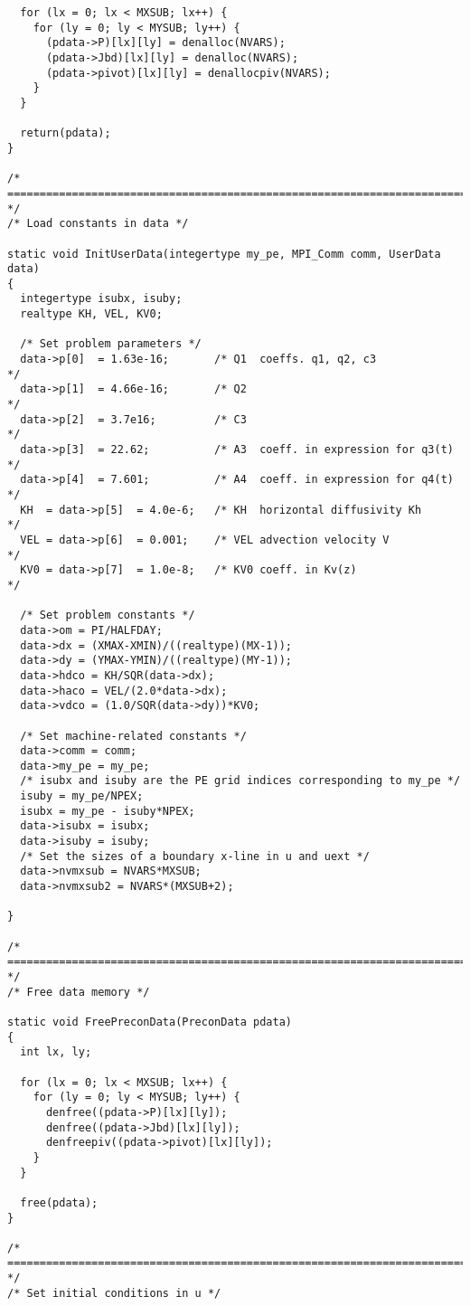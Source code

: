 \begin{verbatim}
  for (lx = 0; lx < MXSUB; lx++) {
    for (ly = 0; ly < MYSUB; ly++) {
      (pdata->P)[lx][ly] = denalloc(NVARS);
      (pdata->Jbd)[lx][ly] = denalloc(NVARS);
      (pdata->pivot)[lx][ly] = denallocpiv(NVARS);
    }
  }

  return(pdata);
}

/* ======================================================================= */
/* Load constants in data */

static void InitUserData(integertype my_pe, MPI_Comm comm, UserData data)
{
  integertype isubx, isuby;
  realtype KH, VEL, KV0;

  /* Set problem parameters */
  data->p[0]  = 1.63e-16;       /* Q1  coeffs. q1, q2, c3             */
  data->p[1]  = 4.66e-16;       /* Q2                                 */
  data->p[2]  = 3.7e16;         /* C3                                 */
  data->p[3]  = 22.62;          /* A3  coeff. in expression for q3(t) */
  data->p[4]  = 7.601;          /* A4  coeff. in expression for q4(t) */
  KH  = data->p[5]  = 4.0e-6;   /* KH  horizontal diffusivity Kh      */ 
  VEL = data->p[6]  = 0.001;    /* VEL advection velocity V           */
  KV0 = data->p[7]  = 1.0e-8;   /* KV0 coeff. in Kv(z)                */ 

  /* Set problem constants */
  data->om = PI/HALFDAY;
  data->dx = (XMAX-XMIN)/((realtype)(MX-1));
  data->dy = (YMAX-YMIN)/((realtype)(MY-1));
  data->hdco = KH/SQR(data->dx);
  data->haco = VEL/(2.0*data->dx);
  data->vdco = (1.0/SQR(data->dy))*KV0;

  /* Set machine-related constants */
  data->comm = comm;
  data->my_pe = my_pe;
  /* isubx and isuby are the PE grid indices corresponding to my_pe */
  isuby = my_pe/NPEX;
  isubx = my_pe - isuby*NPEX;
  data->isubx = isubx;
  data->isuby = isuby;
  /* Set the sizes of a boundary x-line in u and uext */
  data->nvmxsub = NVARS*MXSUB;
  data->nvmxsub2 = NVARS*(MXSUB+2);

}

/* ======================================================================= */
/* Free data memory */

static void FreePreconData(PreconData pdata)
{
  int lx, ly;

  for (lx = 0; lx < MXSUB; lx++) {
    for (ly = 0; ly < MYSUB; ly++) {
      denfree((pdata->P)[lx][ly]);
      denfree((pdata->Jbd)[lx][ly]);
      denfreepiv((pdata->pivot)[lx][ly]);
    }
  }

  free(pdata);
}

/* ======================================================================= */
/* Set initial conditions in u */


\end{verbatim}
